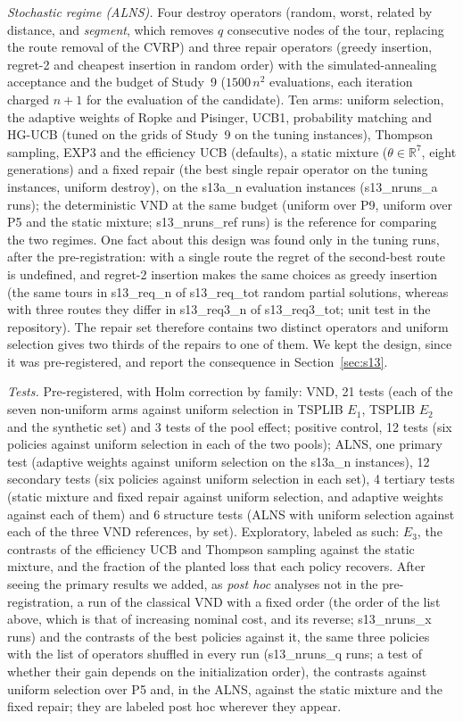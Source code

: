 \emph{Stochastic regime (ALNS).} Four destroy operators (random, worst, related by distance, and \emph{segment}, which removes $q$ consecutive nodes of the tour, replacing the route removal of the CVRP) and three repair operators (greedy insertion, regret-2 and cheapest insertion in random order) with the simulated-annealing acceptance and the budget of Study~9 ($1500\,n^2$ evaluations, each iteration charged $n+1$ for the evaluation of the candidate). Ten arms: uniform selection, the adaptive weights of Ropke and Pisinger, UCB1, probability matching and HG-UCB (tuned on the grids of Study~9 on the tuning instances), Thompson sampling, EXP3 and the efficiency UCB (defaults), a static mixture ($\theta\in\mathbb{R}^7$, eight generations) and a fixed repair (the best single repair operator on the tuning instances, uniform destroy), on the \num{s13a_n} evaluation instances (\num{s13_nruns_a} runs); the deterministic VND at the same budget (uniform over P9, uniform over P5 and the static mixture; \num{s13_nruns_ref} runs) is the reference for comparing the two regimes. One fact about this design was found only in the tuning runs, after the pre-registration: with a single route the regret of the second-best route is undefined, and regret-2 insertion makes the same choices as greedy insertion (the same tours in \num{s13_req_n} of \num{s13_req_tot} random partial solutions, whereas with three routes they differ in \num{s13_req3_n} of \num{s13_req3_tot}; unit test in the repository). The repair set therefore contains two distinct operators and uniform selection gives two thirds of the repairs to one of them. We kept the design, since it was pre-registered, and report the consequence in Section~\ref{sec:s13}.

\emph{Tests.} Pre-registered, with Holm correction by family: VND, 21 tests (each of the seven non-uniform arms against uniform selection in TSPLIB $E_1$, TSPLIB $E_2$ and the synthetic set) and 3 tests of the pool effect; positive control, 12 tests (six policies against uniform selection in each of the two pools); ALNS, one primary test (adaptive weights against uniform selection on the \num{s13a_n} instances), 12 secondary tests (six policies against uniform selection in each set), 4 tertiary tests (static mixture and fixed repair against uniform selection, and adaptive weights against each of them) and 6 structure tests (ALNS with uniform selection against each of the three VND references, by set). Exploratory, labeled as such: $E_3$, the contrasts of the efficiency UCB and Thompson sampling against the static mixture, and the fraction of the planted loss that each policy recovers. After seeing the primary results we added, as \emph{post hoc} analyses not in the pre-registration, a run of the classical VND with a fixed order (the order of the list above, which is that of increasing nominal cost, and its reverse; \num{s13_nruns_x} runs) and the contrasts of the best policies against it, the same three policies with the list of operators shuffled in every run (\num{s13_nruns_q} runs; a test of whether their gain depends on the initialization order), the contrasts against uniform selection over P5 and, in the ALNS, against the static mixture and the fixed repair; they are labeled post hoc wherever they appear.

